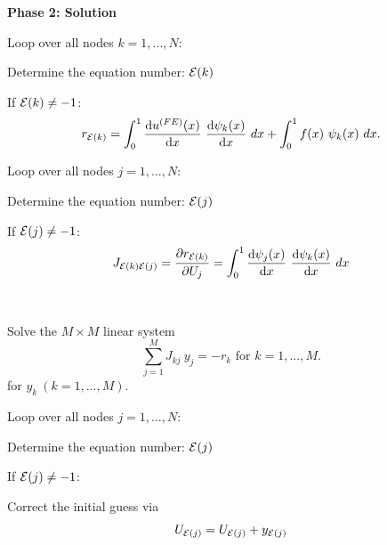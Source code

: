 {\bfseries  Phase 2\-: Solution } \par
 \begin{TabularC}{1}
\hline

\begin{DoxyItemize}
\item Loop over all nodes $ k=1,...,N$\-:
\begin{DoxyItemize}
\item Determine the equation number\-: $ {\cal E}(k) $
\item If $ {\cal E}(k) \ne -1 $\-: \[ r_{{\cal E}(k)} = \int_0^1 \frac{\mbox{d} u^{(FE)}(x)}{\mbox{d} x} \ \frac{\mbox{d} \psi_k(x)}{\mbox{d} x} \ dx + \int_0^1 f(x) \ \psi_k(x) \ dx. \]
\begin{DoxyItemize}
\item Loop over all nodes $ j=1,...,N$\-:
\item Determine the equation number\-: $ {\cal E}(j) $
\item If $ {\cal E}(j) \ne -1 $\-: \[ J_{{\cal E}(k){\cal E}(j)} = \frac{\partial r_{{\cal E}(k)}}{\partial U_j} = \int_0^1 \frac{\mbox{d} \psi_j(x)}{\mbox{d} x} \ \frac{\mbox{d} \psi_k(x)}{\mbox{d} x} \ dx \]
\end{DoxyItemize}
\end{DoxyItemize}
\end{DoxyItemize}\\
\end{TabularC}

\begin{DoxyItemize}
\item Solve the $ M \times M$ linear system \[ \sum_{j=1}^{M} J_{kj} \ y_j = - r_k \mbox{\ \ \ for $k=1,...,M.$} \] for $ y_k \ (k=1,...,M)$.
\end{DoxyItemize}\begin{TabularC}{1}
\hline

\begin{DoxyItemize}
\item Loop over all nodes $ j=1,...,N$\-:
\begin{DoxyItemize}
\item Determine the equation number\-: $ {\cal E}(j) $
\item If $ {\cal E}(j) \ne -1 $\-:
\item Correct the initial guess via \[ U_{{\cal E}(j)} = U_{{\cal E}(j)} + y_{{\cal E}(j)} \]
\end{DoxyItemize}
\end{DoxyItemize}\\
\end{TabularC}

